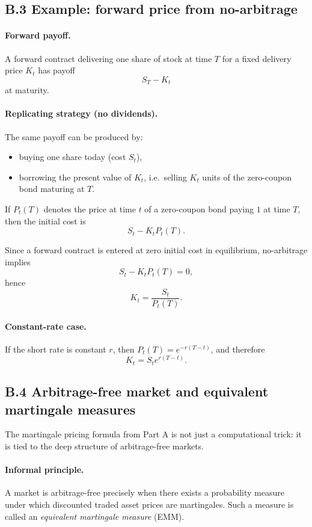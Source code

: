 \documentclass[11pt]{article}
\newcommand{\1}{\mathbf{1}}
\begin{document}
\subsection*{B.3 Example: forward price from no-arbitrage}

\paragraph{Forward payoff.}
A forward contract delivering one share of stock at time \(T\) for a fixed delivery price \(K_t\)
has payoff
$$
S_T-K_t
$$
at maturity.

\paragraph{Replicating strategy (no dividends).}
The same payoff can be produced by:
\begin{itemize}[leftmargin=1.4em]
    \item buying one share today (cost \(S_t\)),
    \item borrowing the present value of \(K_t\), i.e.\ selling \(K_t\) units of the zero-coupon bond maturing at \(T\).
\end{itemize}
If \(P_t(T)\) denotes the price at time \(t\) of a zero-coupon bond paying \(1\) at time \(T\), then the initial cost is
$$
S_t-K_t P_t(T).
$$

Since a forward contract is entered at zero initial cost in equilibrium, no-arbitrage implies
$$
S_t-K_tP_t(T)=0,
$$
hence
$$
\boxed{\ K_t=\frac{S_t}{P_t(T)}. \ }
$$

\paragraph{Constant-rate case.}
If the short rate is constant \(r\), then \(P_t(T)=e^{-r(T-t)}\), and therefore
$$
\boxed{\ K_t=S_t e^{r(T-t)}. \ }
$$

\subsection*{B.4 Arbitrage-free market and equivalent martingale measures}

The martingale pricing formula from Part A is not just a computational trick:
it is tied to the deep structure of arbitrage-free markets.

\paragraph{Informal principle.}
A market is arbitrage-free precisely when there exists a probability measure under which discounted traded asset prices are martingales.
Such a measure is called an \emph{equivalent martingale measure} (EMM).
\end{document}
